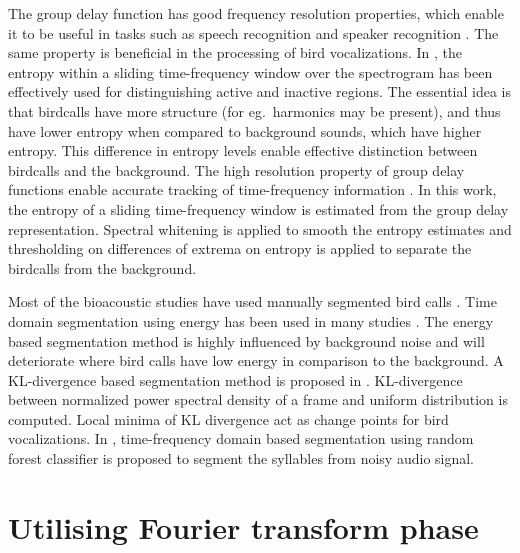 \documentclass[a4paper]{article}
\begin{document}
The group delay function has good frequency resolution properties, which enable
it to be useful in tasks such as speech recognition and speaker recognition
\cite{hema} \cite{padman} \cite{modgdf}. The same property is beneficial in the processing of bird
vocalizations. In \cite{wang2013}, the entropy within a sliding time-frequency
window over the spectrogram has been effectively used for distinguishing active
and inactive regions. The essential idea is that birdcalls have more structure
(for eg.~harmonics may be present), and thus have lower entropy when compared to
 background sounds, which have higher entropy. This difference in entropy
levels enable effective distinction between birdcalls and the background.
The high resolution property of group delay functions enable accurate tracking
of time-frequency information \cite{padman}. In this work, the entropy of a sliding
time-frequency window is estimated from the group delay representation. Spectral
whitening is applied to smooth the entropy estimates and thresholding on differences of extrema on entropy is
applied to separate the birdcalls from the background.

Most of the bioacoustic studies have used manually segmented bird calls \cite{Trifa} \cite{Lee} \cite{Kaewtip}. Time domain segmentation using energy has been used in many studies \cite{Harma} \cite{Somervuo} \cite{Fagerlund} . The energy  based segmentation method is highly influenced by background noise and will deteriorate  where bird calls have low energy in comparison to the background. A KL-divergence based segmentation method   is proposed in \cite{Lakshmi}.  KL-divergence between normalized power spectral density of a frame and uniform distribution is computed. Local minima of KL divergence act as change points for bird vocalizations. In \cite{Neal} , time-frequency domain based segmentation using random forest classifier is proposed to segment the syllables from noisy audio signal. 





\section{Utilising Fourier transform phase}
\end{document}

